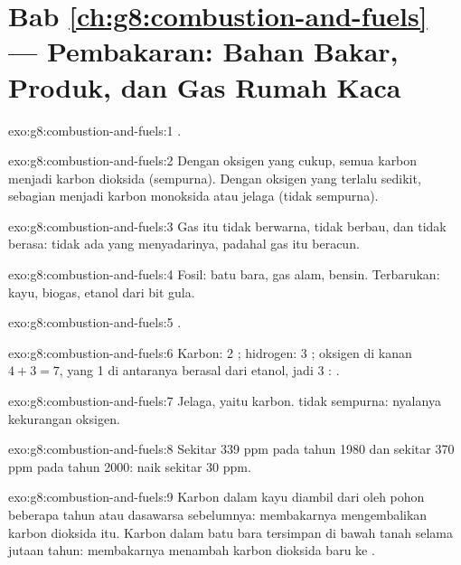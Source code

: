 \section*{Bab \ref{ch:g8:combustion-and-fuels} --- Pembakaran: Bahan Bakar, Produk, dan Gas Rumah Kaca}

\begin{solution}{exo:g8:combustion-and-fuels:1}
.
\end{solution}

\begin{solution}{exo:g8:combustion-and-fuels:2}
Dengan oksigen yang cukup, semua karbon menjadi karbon dioksida
(sempurna). Dengan oksigen yang terlalu sedikit, sebagian menjadi karbon
monoksida atau jelaga (tidak sempurna).
\end{solution}

\begin{solution}{exo:g8:combustion-and-fuels:3}
Gas itu tidak berwarna, tidak berbau, dan tidak berasa: tidak ada yang
menyadarinya, padahal gas itu beracun.
\end{solution}

\begin{solution}{exo:g8:combustion-and-fuels:4}
Fosil: batu bara, gas alam, bensin. Terbarukan: kayu, biogas, etanol
dari bit gula.
\end{solution}

\begin{solution}{exo:g8:combustion-and-fuels:5}
.
\end{solution}

\begin{solution}{exo:g8:combustion-and-fuels:6}
Karbon: 2 ; hidrogen: 3 ; oksigen di kanan $4 + 3 =
7$, yang 1 di antaranya berasal dari etanol, jadi 3 :
.
\end{solution}

\begin{solution}{exo:g8:combustion-and-fuels:7}
Jelaga, yaitu karbon.  tidak sempurna: nyalanya kekurangan
oksigen.
\end{solution}

\begin{solution}{exo:g8:combustion-and-fuels:8}
Sekitar 339 ppm pada tahun 1980 dan sekitar 370 ppm pada tahun 2000:
naik sekitar 30 ppm.
\end{solution}

\begin{solution}{exo:g8:combustion-and-fuels:9}
Karbon dalam kayu diambil dari  oleh pohon beberapa tahun atau
dasawarsa sebelumnya: membakarnya mengembalikan karbon dioksida itu.
Karbon dalam batu bara tersimpan di bawah tanah selama jutaan tahun:
membakarnya menambah karbon dioksida baru ke .
\end{solution}

